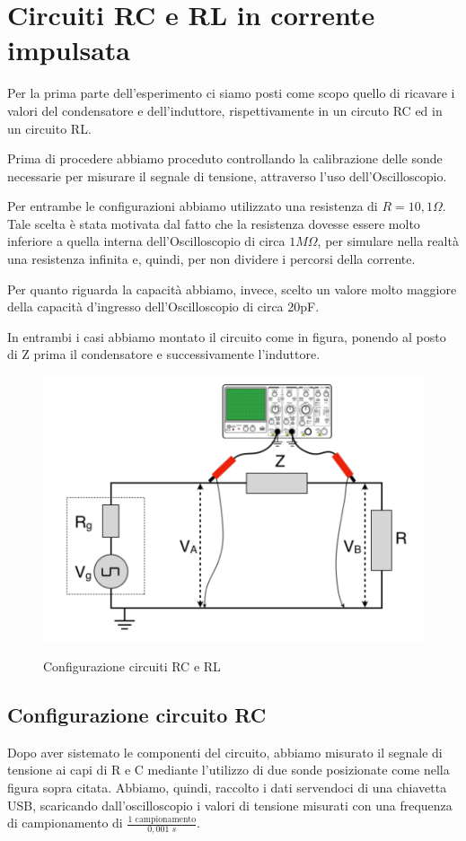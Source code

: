 \section{Circuiti RC e RL in corrente impulsata}
Per la prima parte dell'esperimento ci siamo posti come scopo quello di ricavare i valori del condensatore e dell'induttore, rispettivamente in un circuto RC ed in un circuito RL.

Prima di procedere abbiamo proceduto controllando la calibrazione delle sonde necessarie per misurare il segnale di tensione, attraverso l'uso dell'Oscilloscopio.

Per entrambe le configurazioni abbiamo utilizzato una resistenza di $R=10,1\Omega$. Tale scelta è stata motivata dal fatto che la resistenza dovesse essere molto inferiore a quella interna dell'Oscilloscopio di circa $1M\Omega$, per simulare nella realtà una resistenza infinita e, quindi, per non dividere i percorsi della corrente.

Per quanto riguarda la capacità abbiamo, invece, scelto un valore molto maggiore della capacità d'ingresso dell'Oscilloscopio di circa 20pF.

In entrambi i casi abbiamo montato il circuito come in figura, ponendo al posto di Z prima il condensatore e successivamente l'induttore.

\begin{figure} [H]
    \centering
    \includegraphics[scale=.9]{Immagini/Configurazione1.PNG}
    \label{fig:my_label}
    \caption{Configurazione circuiti RC e RL}
\end{figure}

\subsection{Configurazione circuito RC}
Dopo aver sistemato le componenti del circuito, abbiamo misurato il segnale di tensione ai capi di R e C mediante l'utilizzo di due sonde posizionate come nella figura sopra citata. Abbiamo, quindi, raccolto i dati servendoci di una chiavetta USB, scaricando dall'oscilloscopio i valori di tensione misurati con una frequenza di campionamento di $\frac{1\,\,\text{campionamento}}{0,001\,\,s}$.


